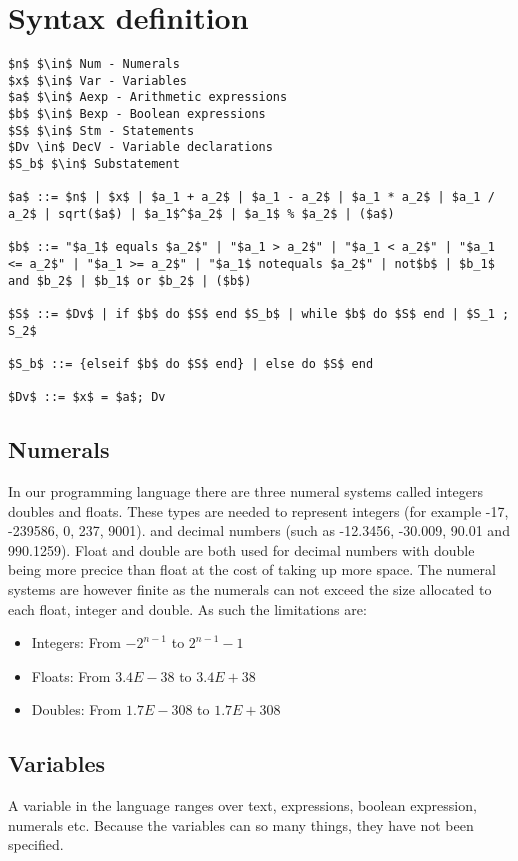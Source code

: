 \section{Syntax definition}\label{sec:anlysis:syntax-definition}
\begin{lstlisting}[mathescape, captionpos=b, caption={Syntax formation rules}, label={lst:syntax-formation}]
$n$ $\in$ Num - Numerals
$x$ $\in$ Var - Variables
$a$ $\in$ Aexp - Arithmetic expressions
$b$ $\in$ Bexp - Boolean expressions
$S$ $\in$ Stm - Statements
$Dv \in$ DecV - Variable declarations
$S_b$ $\in$ Substatement

$a$ ::= $n$ | $x$ | $a_1 + a_2$ | $a_1 - a_2$ | $a_1 * a_2$ | $a_1 / a_2$ | sqrt($a$) | $a_1$^$a_2$ | $a_1$ % $a_2$ | ($a$)

$b$ ::= "$a_1$ equals $a_2$" | "$a_1 > a_2$" | "$a_1 < a_2$" | "$a_1 <= a_2$" | "$a_1 >= a_2$" | "$a_1$ notequals $a_2$" | not$b$ | $b_1$ and $b_2$ | $b_1$ or $b_2$ | ($b$)

$S$ ::= $Dv$ | if $b$ do $S$ end $S_b$ | while $b$ do $S$ end | $S_1 ; S_2$

$S_b$ ::= {elseif $b$ do $S$ end} | else do $S$ end

$Dv$ ::= $x$ = $a$; Dv
\end{lstlisting}

\subsection{Numerals}
In our programming language there are three numeral systems called integers doubles and floats. These types are needed to represent integers (for example -17, -239586, 0, 237, 9001). and decimal numbers (such as -12.3456, -30.009, 90.01 and 990.1259). Float and double are both used for decimal numbers with double being more precice than float at the cost of taking up more space. The numeral systems are however finite as the numerals can not exceed the size allocated to each float, integer and double. As such the limitations are:
\begin{itemize}
\item Integers: From $-2^{n-1}$ to $2^{n-1}-1$
\item Floats: From $3.4E-38$ to $3.4E+38$
\item Doubles: From $1.7E-308$ to $1.7E+308$
\end{itemize}

\subsection{Variables}
A variable in the language ranges over text, expressions, boolean expression, numerals etc. Because the variables can so many things, they have not been specified. 


